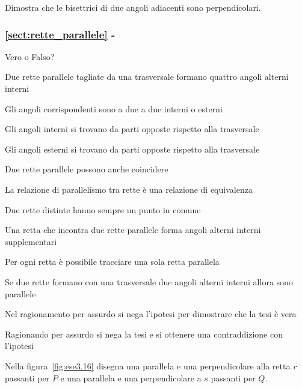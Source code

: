\begin{esercizio}
\label{ese:3.14}
Dimostra che le bisettrici di due angoli adiacenti sono 
perpendicolari.
\end{esercizio}

\begingroup
\hypersetup{linkcolor=black}
\subsubsection*{\ref{sect:rette_parallele} - 
}
\endgroup

\begin{esercizio}
\label{ese:3.15}
Vero o Falso?
\begin{enumeratea}
\item Due rette parallele tagliate da una trasversale formano quattro 
angoli alterni interni\tab\hfill\boxV\quad\boxF
\item Gli angoli corrispondenti sono a due a due interni o 
esterni\hfill\boxV\quad\boxF
\item Gli angoli interni si trovano da parti opposte rispetto alla 
trasversale\hfill\boxV\quad\boxF
\item Gli angoli esterni si trovano da parti opposte rispetto alla 
trasversale\hfill\boxV\quad\boxF
\item Due rette parallele possono anche 
coincidere\hfill\boxV\quad\boxF
\item La relazione di parallelismo tra rette è una relazione di 
equivalenza\hfill\boxV\quad\boxF
\item Due rette distinte hanno sempre un punto in 
comune\hfill\boxV\quad\boxF
\item Una retta che incontra due rette parallele forma angoli alterni 
interni supplementari\tab\hfill\boxV\quad\boxF
\item Per ogni retta è possibile tracciare una sola retta 
parallela\hfill\boxV\quad\boxF
\item Se due rette formano con una trasversale due angoli alterni 
interni allora sono parallele\tab\hfill\boxV\quad\boxF
\item Nel ragionamento per assurdo si nega l'ipotesi per dimostrare 
che la tesi è vera\tab\tab\hfill\boxV\quad\boxF
\item Ragionando per assurdo si nega la tesi e si ottenere una 
contraddizione con l'ipotesi\tab\hfill\boxV\quad\boxF
\end{enumeratea}
\end{esercizio}

\begin{esercizio}
\label{ese:3.16}
Nella figura~\ref{fig:ese3.16} disegna una parallela e una 
perpendicolare alla retta $r$ passanti per $P$ e una parallela e una 
perpendicolare a $s$ passanti per $Q$.
\end{esercizio}

